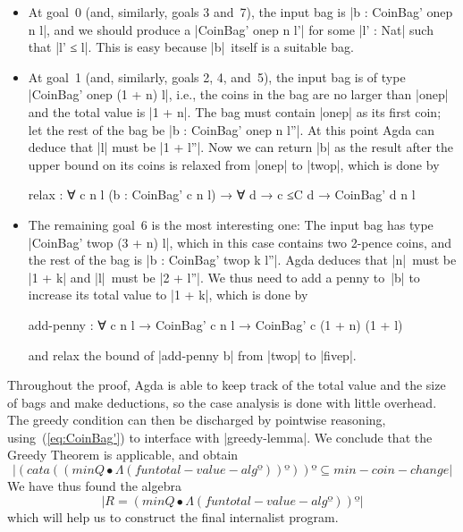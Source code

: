 \begin{itemize}
\item At goal~0 (and, similarly, goals 3 and~7), the input bag is |b : CoinBag' onep n l|, and we should produce a |CoinBag' onep n l'| for some |l' : Nat| such that |l' ≤ l|.
This is easy because |b|~itself is a suitable bag.
\item At goal~1 (and, similarly, goals 2, 4, and~5), the input bag is of type |CoinBag' onep (1 + n) l|, i.e., the coins in the bag are no larger than |onep| and the total value is |1 + n|.
The bag must contain |onep| as its first coin; let the rest of the bag be |b : CoinBag' onep n l''|.
At this point Agda can deduce that |l| must be |1 + l''|.
Now we can return |b| as the result after the upper bound on its coins is relaxed from |onep| to |twop|, which is done by
\begin{code}
relax :  ∀ {c n l} (b : CoinBag' c n l) →
         ∀ {d} → c ≤C d → CoinBag' d n l
\end{code}
\item The remaining goal~6 is the most interesting one:
The input bag has type |CoinBag' twop (3 + n) l|, which in this case contains two 2-pence coins, and the rest of the bag is |b : CoinBag' twop k l''|.
Agda deduces that |n|~must be |1 + k| and |l|~must be |2 + l''|.
We thus need to add a penny to~|b| to increase its total value to |1 + k|, which is done by
\begin{code}add-penny :
  ∀ {c n l} → CoinBag' c n l → CoinBag' c (1 + n) (1 + l)
\end{code}
and relax the bound of |add-penny b| from |twop| to |fivep|.
\end{itemize}
Throughout the proof, Agda is able to keep track of the total value and the size of bags and make deductions, so the case analysis is done with little overhead.
The greedy condition can then be discharged by pointwise reasoning, using~(\ref{eq:CoinBag'}) to interface with |greedy-lemma|.
We conclude that the Greedy Theorem is applicable, and obtain
\[ |(cata((min Q •Λ (fun total-value-alg º)) º)) º ⊆ min-coin-change| \]
We have thus found the algebra
\[ |R = (min Q •Λ (fun total-value-alg º)) º| \]
which will help us to construct the final internalist program.

